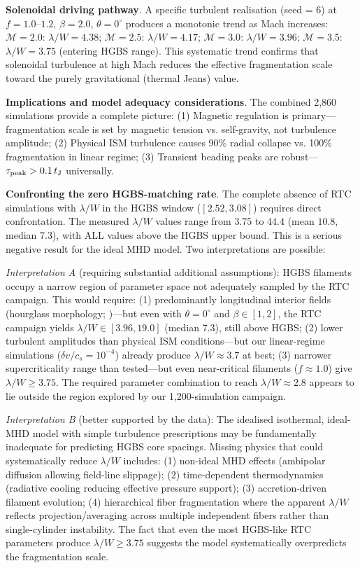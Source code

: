 \documentclass[twocolumn]{mnras}
\begin{document}
\textbf{Solenoidal driving pathway}. A specific turbulent realisation (seed = 6) at $f = 1.0$--$1.2$, $\beta = 2.0$, $\theta = 0^\circ$ produces a monotonic trend as Mach increases: $\mathcal{M} = 2.0$: $\lambda/W = 4.38$; $\mathcal{M} = 2.5$: $\lambda/W = 4.17$; $\mathcal{M} = 3.0$: $\lambda/W = 3.96$; $\mathcal{M} = 3.5$: $\lambda/W = 3.75$ (entering HGBS range). This systematic trend confirms that solenoidal turbulence at high Mach reduces the effective fragmentation scale toward the purely gravitational (thermal Jeans) value.

\textbf{Implications and model adequacy considerations}. The combined 2,860 simulations provide a complete picture: (1) Magnetic regulation is primary—fragmentation scale is set by magnetic tension vs. self-gravity, not turbulence amplitude; (2) Physical ISM turbulence causes 90\% radial collapse vs. 100\% fragmentation in linear regime; (3) Transient beading peaks are robust—$\tau_{\rm peak} > 0.1\,t_{\rm J}$ universally.

\textbf{Confronting the zero HGBS-matching rate}. The complete absence of RTC simulations with $\lambda/W$ in the HGBS window ($[2.52, 3.08]$) requires direct confrontation. The measured $\lambda/W$ values range from $3.75$ to $44.4$ (mean $10.8$, median $7.3$), with ALL values above the HGBS upper bound. This is a serious negative result for the ideal MHD model. Two interpretations are possible:

\textit{Interpretation A} (requiring substantial additional assumptions): HGBS filaments occupy a narrow region of parameter space not adequately sampled by the RTC campaign. This would require: (1) predominantly longitudinal interior fields (hourglass morphology; \citet{Jadhav2026})—but even with $\theta = 0^\circ$ and $\beta \in [1, 2]$, the RTC campaign yields $\lambda/W \in [3.96, 19.0]$ (median 7.3), still above HGBS; (2) lower turbulent amplitudes than physical ISM conditions—but our linear-regime simulations ($\delta v/c_s = 10^{-4}$) already produce $\lambda/W \approx 3.7$ at best; (3) narrower supercriticality range than tested—but even near-critical filaments ($f \approx 1.0$) give $\lambda/W \geq 3.75$. The required parameter combination to reach $\lambda/W \approx 2.8$ appears to lie outside the region explored by our 1,200-simulation campaign.

\textit{Interpretation B} (better supported by the data): The idealised isothermal, ideal-MHD model with simple turbulence prescriptions may be fundamentally inadequate for predicting HGBS core spacings. Missing physics that could systematically reduce $\lambda/W$ includes: (1) non-ideal MHD effects (ambipolar diffusion allowing field-line slippage); (2) time-dependent thermodynamics (radiative cooling reducing effective pressure support); (3) accretion-driven filament evolution; (4) hierarchical fiber fragmentation where the apparent $\lambda/W$ reflects projection/averaging across multiple independent fibers rather than single-cylinder instability. The fact that even the most HGBS-like RTC parameters produce $\lambda/W \geq 3.75$ suggests the model systematically overpredicts the fragmentation scale.
\end{document}
